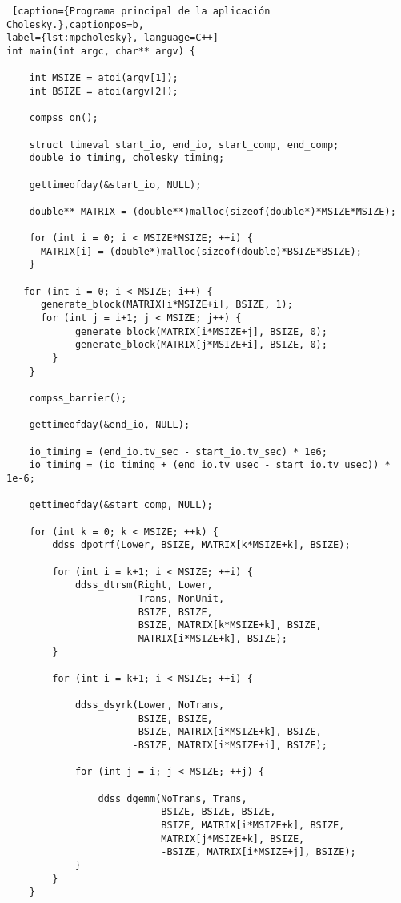 \begin{lstlisting} [caption={Programa principal de la aplicación Cholesky.},captionpos=b, 
label={lst:mpcholesky}, language=C++]
int main(int argc, char** argv) {

    int MSIZE = atoi(argv[1]);
    int BSIZE = atoi(argv[2]);

    compss_on();
    
    struct timeval start_io, end_io, start_comp, end_comp;
    double io_timing, cholesky_timing;
    
    gettimeofday(&start_io, NULL);

    double** MATRIX = (double**)malloc(sizeof(double*)*MSIZE*MSIZE);
    
    for (int i = 0; i < MSIZE*MSIZE; ++i) {
      MATRIX[i] = (double*)malloc(sizeof(double)*BSIZE*BSIZE);
    }   
 
   for (int i = 0; i < MSIZE; i++) {
      generate_block(MATRIX[i*MSIZE+i], BSIZE, 1);
      for (int j = i+1; j < MSIZE; j++) {
            generate_block(MATRIX[i*MSIZE+j], BSIZE, 0);
            generate_block(MATRIX[j*MSIZE+i], BSIZE, 0);
        }
    } 

    compss_barrier();

    gettimeofday(&end_io, NULL);

    io_timing = (end_io.tv_sec - start_io.tv_sec) * 1e6;
    io_timing = (io_timing + (end_io.tv_usec - start_io.tv_usec)) * 1e-6; 

    gettimeofday(&start_comp, NULL);

    for (int k = 0; k < MSIZE; ++k) {
        ddss_dpotrf(Lower, BSIZE, MATRIX[k*MSIZE+k], BSIZE);

        for (int i = k+1; i < MSIZE; ++i) {
            ddss_dtrsm(Right, Lower, 
		               Trans, NonUnit, 
                	   BSIZE, BSIZE,
                       BSIZE, MATRIX[k*MSIZE+k], BSIZE,
                       MATRIX[i*MSIZE+k], BSIZE);
        }        

        for (int i = k+1; i < MSIZE; ++i) {

            ddss_dsyrk(Lower, NoTrans,
                       BSIZE, BSIZE,
                       BSIZE, MATRIX[i*MSIZE+k], BSIZE,
                      -BSIZE, MATRIX[i*MSIZE+i], BSIZE);
        
            for (int j = i; j < MSIZE; ++j) {

                ddss_dgemm(NoTrans, Trans,
                    	   BSIZE, BSIZE, BSIZE,
                           BSIZE, MATRIX[i*MSIZE+k], BSIZE,
                           MATRIX[j*MSIZE+k], BSIZE,
                           -BSIZE, MATRIX[i*MSIZE+j], BSIZE);
            }
        }
    }


\end{lstlisting}
